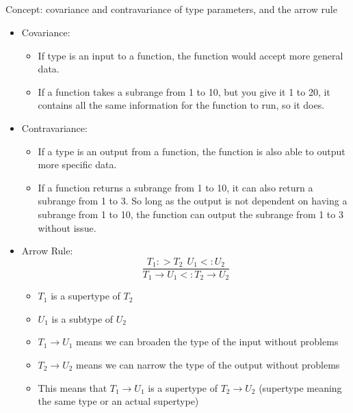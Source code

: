 \subsection{}
Concept: covariance and contravariance of type parameters, and the arrow rule

\begin{itemize}
\item Covariance:
  \begin{itemize}[noitemsep]
  \item If type is an input to a function, the function would accept more general data.
  \item If a function takes a subrange from 1 to 10, but you give it 1 to 20, it contains all the same information for the function to run, so it does.
  \end{itemize}

\item Contravariance:
  \begin{itemize}[noitemsep]
  \item If a type is an output from a function, the function is also able to output more specific data.
  \item If a function returns a subrange from 1 to 10, it can also return a subrange from 1 to 3. So long as the output is not dependent on having a subrange from 1 to 10, the function can output the subrange from 1 to 3 without issue.
  \end{itemize}

\item Arrow Rule:
  \begin{equation*}
    \dfrac{T_{1} :> T_{2} \:\: U_{1} <: U_{2}}{T_{1} \rightarrow U_{1} <: T_{2} \rightarrow U_{2}}
  \end{equation*}
  \begin{itemize}[noitemsep]
  \item $T_{1}$ is a supertype of $T_{2}$
  \item $U_{1}$ is a subtype of $U_{2}$
  \item $T_{1} \rightarrow U_{1}$ means we can broaden the type of the input without problems
  \item $T_{2} \rightarrow U_{2}$ means we can narrow the type of the output without problems
  \item This means that $T_{1} \rightarrow U_{1}$ is a supertype of $T_{2} \rightarrow U_{2}$ (supertype meaning the same type or an actual supertype)
  \end{itemize}
\end{itemize}

